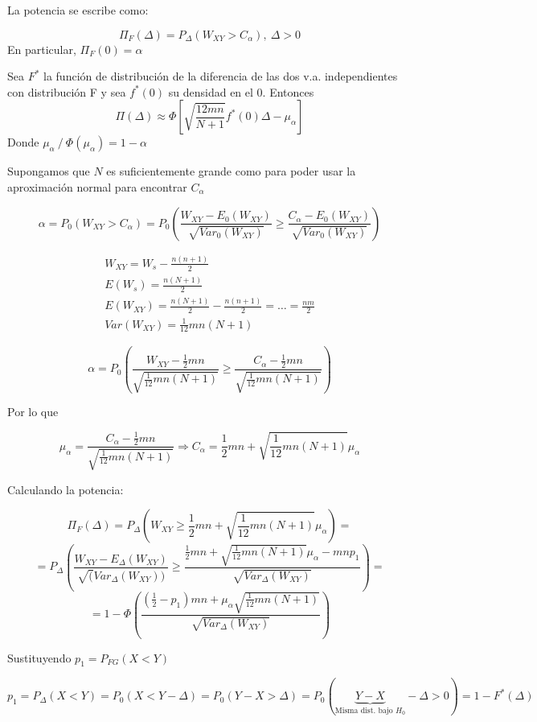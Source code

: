 La potencia se escribe como:

$$
\Pi_F(\Delta)=P_\Delta(W_{XY}>C_\alpha),\ \Delta>0
$$
En particular, $\Pi_F(0)=\alpha$

\begin{theorem}
    Sea $F^*$ la función de distribución de la diferencia de las dos v.a. independientes con distribución F y sea $f^*(0)$ su densidad en el 0. Entonces
    $$
    \Pi(\Delta)\approx\Phi\left[\sqrt{\frac{12mn}{N+1}}f^*(0)\Delta-\mu_\alpha\right]
    $$
    Donde $\mu_\alpha\ /\ \Phi(\mu_\alpha)=1-\alpha$
\end{theorem}

Supongamos que $N$ es suficientemente grande como para poder usar la aproximación normal para encontrar $C_\alpha$

$$
\alpha = P_0(W_{XY}>C_\alpha)=P_0\left(\frac{W_{XY}-E_0(W_{XY})}{\sqrt{Var_0(W_{XY})}}\geq \frac{C_\alpha-E_0(W_{XY})}{\sqrt{Var_0(W_{XY})}}\right)
$$

$$
\begin{array}{c}
    W_{XY}=W_s-\frac{n(n+1)}{2}\\
    E(W_s)=\frac{n(N+1)}{2}\\
    E(W_{XY})=\frac{n(N+1)}{2}-\frac{n(n+1)}{2}=\dots=\frac{nm}{2}\\
    Var(W_{XY})=\frac{1}{12}mn(N+1)
\end{array}
$$

$$
\alpha=P_0\left(\frac{W_{XY}-\frac{1}{2}mn}{\sqrt{\frac{1}{12}mn(N+1)}}\geq \frac{C_\alpha-\frac{1}{2}mn}{\sqrt{\frac{1}{12}mn(N+1)}}\right)
$$

\newpage

Por lo que 

$$
\mu_\alpha=\frac{C_\alpha-\frac{1}{2}mn}{\sqrt{\frac{1}{12}mn(N+1)}} \Longrightarrow C_\alpha=\frac{1}{2}mn+\sqrt{\frac{1}{12}mn(N+1)}\mu_\alpha
$$

Calculando la potencia:

$$
    \Pi_F(\Delta)=P_\Delta\left(W_{XY}\geq\frac{1}{2}mn+\sqrt{\frac{1}{12}mn(N+1)}\mu_\alpha\right)=
$$
$$
    =P_\Delta\left(\frac{W_{XY}-E_\Delta(W_{XY})}{\sqrt(Var_\Delta(W_{XY}))}\geq\frac{\frac{1}{2}mn+\sqrt{\frac{1}{12}mn(N+1)}\mu_\alpha-mnp_1}{\sqrt{Var_\Delta(W_{XY})}} \right)=
$$
$$
    =1-\Phi\left(\frac{\left(\frac{1}{2}-p_1\right)mn+\mu_\alpha\sqrt{\frac{1}{12}mn(N+1)}}{\sqrt{Var_\Delta(W_{XY})}}\right)
$$

Sustituyendo $p_1=P_{FG}(X<Y)$

$$
    p_1=P_\Delta(X<Y)=P_0(X<Y-\Delta)=P_0(Y-X>\Delta)=P_0(\underbrace{Y-X}_\text{Misma dist. bajo $H_0$}-\Delta>0)=1-F^*(\Delta)
$$

